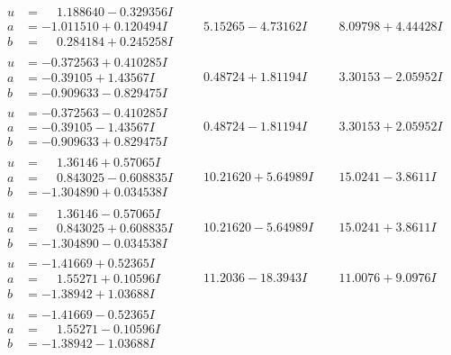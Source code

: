\documentclass[1p]{elsarticle_modified}
\theoremstyle{definition}
\begin{document}
$$\begin{array}{c|c|c}
\begin{aligned}
u &= \phantom{-}1.188640 - 0.329356 I \\
a &= -1.011510 + 0.120494 I \\
b &= \phantom{-}0.284184 + 0.245258 I\end{aligned}
 & \phantom{-}5.15265 - 4.73162 I & \phantom{-}8.09798 + 4.44428 I \\ \hline\begin{aligned}
u &= -0.372563 + 0.410285 I \\
a &= -0.39105 + 1.43567 I \\
b &= -0.909633 - 0.829475 I\end{aligned}
 & \phantom{-}0.48724 + 1.81194 I & \phantom{-}3.30153 - 2.05952 I \\ \hline\begin{aligned}
u &= -0.372563 - 0.410285 I \\
a &= -0.39105 - 1.43567 I \\
b &= -0.909633 + 0.829475 I\end{aligned}
 & \phantom{-}0.48724 - 1.81194 I & \phantom{-}3.30153 + 2.05952 I \\ \hline\begin{aligned}
u &= \phantom{-}1.36146 + 0.57065 I \\
a &= \phantom{-}0.843025 - 0.608835 I \\
b &= -1.304890 + 0.034538 I\end{aligned}
 & \phantom{-}10.21620 + 5.64989 I & \phantom{-}15.0241 - 3.8611 I \\ \hline\begin{aligned}
u &= \phantom{-}1.36146 - 0.57065 I \\
a &= \phantom{-}0.843025 + 0.608835 I \\
b &= -1.304890 - 0.034538 I\end{aligned}
 & \phantom{-}10.21620 - 5.64989 I & \phantom{-}15.0241 + 3.8611 I \\ \hline\begin{aligned}
u &= -1.41669 + 0.52365 I \\
a &= \phantom{-}1.55271 + 0.10596 I \\
b &= -1.38942 + 1.03688 I\end{aligned}
 & \phantom{-}11.2036 - 18.3943 I & \phantom{-}11.0076 + 9.0976 I \\ \hline\begin{aligned}
u &= -1.41669 - 0.52365 I \\
a &= \phantom{-}1.55271 - 0.10596 I \\
b &= -1.38942 - 1.03688 I\end{aligned}

\end{array}$$
\end{document}
